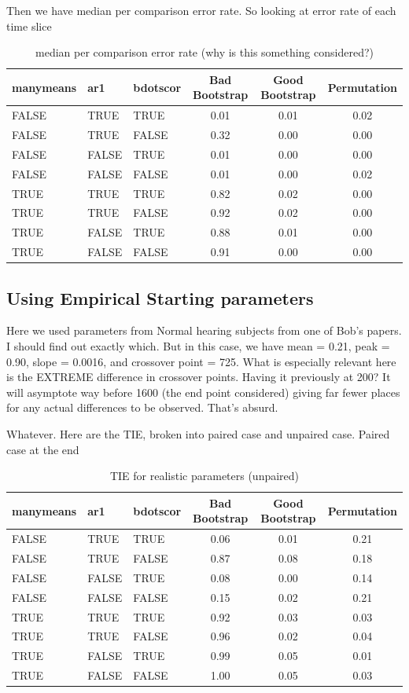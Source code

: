 \documentclass{article}
\begin{document}
Then we have median per comparison error rate. So looking at error rate of each time slice

\begin{table}[H]
\centering
\begin{tabular}{lllccc}
  \hline
  manymeans & ar1 & bdotscor &  Bad Bootstrap & Good Bootstrap & Permutation  \\ 
  \hline
FALSE & TRUE & TRUE & 0.01 & 0.01 & 0.02 \\ 
  FALSE & TRUE & FALSE & 0.32 & 0.00 & 0.00 \\ 
  FALSE & FALSE & TRUE & 0.01 & 0.00 & 0.00 \\ 
  FALSE & FALSE & FALSE & 0.01 & 0.00 & 0.02 \\ 
  TRUE & TRUE & TRUE & 0.82 & 0.02 & 0.00 \\ 
  TRUE & TRUE & FALSE & 0.92 & 0.02 & 0.00 \\ 
  TRUE & FALSE & TRUE & 0.88 & 0.01 & 0.00 \\ 
  TRUE & FALSE & FALSE & 0.91 & 0.00 & 0.00 \\ 
\hline
\end{tabular}
\caption{median per comparison error rate (why is this something considered?)}
\end{table}
\subsection{Using Empirical Starting parameters}

Here we used parameters from Normal hearing subjects from one of Bob's papers. I should find out exactly which. But in this case, we have mean = 0.21, peak = 0.90, slope = 0.0016, and crossover point = 725. What is especially relevant here is the EXTREME difference in crossover points. Having it previously at 200? It will asymptote way before 1600 (the end point considered) giving far fewer places for any actual differences to be observed. That's absurd.

Whatever. Here are the TIE, broken into paired case and unpaired case. Paired case at the end

\begin{table}[H]
\centering
\begin{tabular}{lllccc}
  \hline
  manymeans & ar1 & bdotscor &  Bad Bootstrap & Good Bootstrap & Permutation  \\ 
  \hline
FALSE & TRUE & TRUE & 0.06 & 0.01 & 0.21 \\ 
  FALSE & TRUE & FALSE & 0.87 & 0.08 & 0.18 \\ 
  FALSE & FALSE & TRUE & 0.08 & 0.00 & 0.14 \\ 
  FALSE & FALSE & FALSE & 0.15 & 0.02 & 0.21 \\ 
  TRUE & TRUE & TRUE & 0.92 & 0.03 & 0.03 \\ 
  TRUE & TRUE & FALSE & 0.96 & 0.02 & 0.04 \\ 
  TRUE & FALSE & TRUE & 0.99 & 0.05 & 0.01 \\ 
  TRUE & FALSE & FALSE & 1.00 & 0.05 & 0.03 \\  
   \hline
\end{tabular}
\caption{TIE for realistic parameters (unpaired)}
\end{table}
\end{document}

